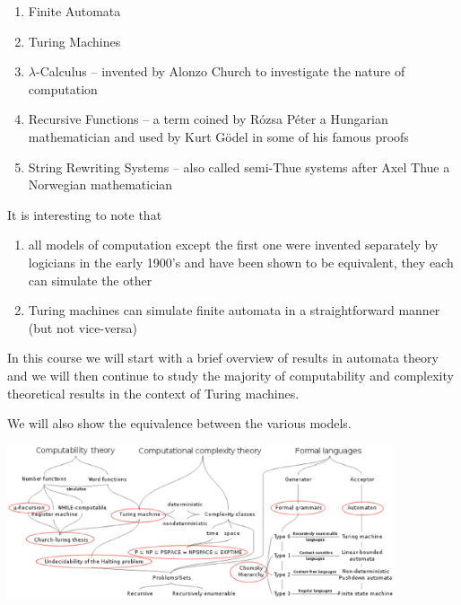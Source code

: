 \documentclass[a4paper,blends,pdf,colorBG,slideColor]{prosper}
\begin{document}
\begin{enumerate}
\item Finite Automata
\item Turing Machines
\item $\lambda$-Calculus -- invented by Alonzo Church to investigate the nature of computation
\item Recursive Functions -- a term coined by R\'{o}zsa P\'{e}ter a Hungarian mathematician and used by Kurt G\"{o}del in some of his famous proofs
\item String Rewriting Systems -- also called semi-Thue systems after Axel Thue a Norwegian mathematician
\end{enumerate}

It is interesting to note that
\begin{enumerate}
\item all models of computation except the first one were invented separately by logicians
in the early 1900's and have been shown to be equivalent, they each can simulate the other 
\item Turing machines can simulate finite automata in a straightforward manner (but not vice-versa)
\end{enumerate}
\es


In this course we will start with a brief overview of results in automata theory and we will then
continue to study the majority of computability and complexity theoretical results in the context
of Turing machines.

We will also show the equivalence between the various models.
\es


\begin{center}
    \includegraphics[height=45mm]{images/course-road-map-00.eps}
\end{center}

\es
\end{document}
